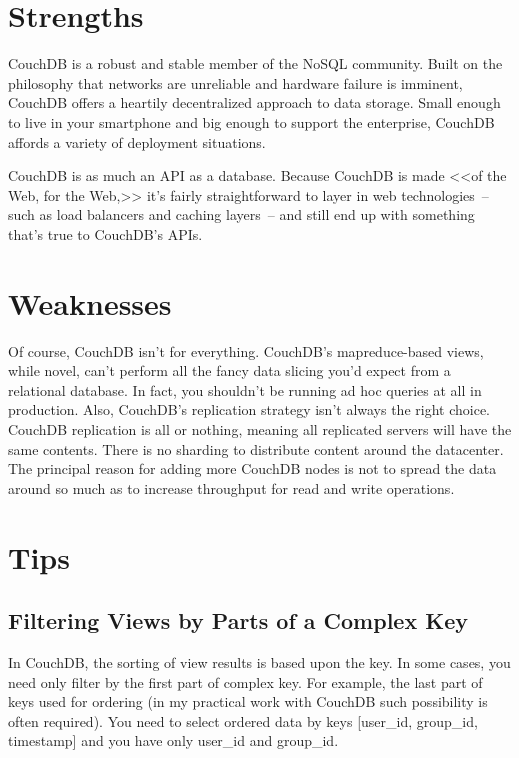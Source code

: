 \section{Strengths}

CouchDB is a robust and stable member of the NoSQL community. Built on the philosophy that networks are unreliable and hardware failure is imminent, CouchDB offers a heartily decentralized approach to data storage. Small enough to live in your smartphone and big enough to support the enterprise, CouchDB affords a variety of deployment situations.

CouchDB is as much an API as a database. Because CouchDB is made <<of the Web, for the Web,>> it’s fairly straightforward to layer in web technologies~-- such as load balancers and caching layers~-- and still end up with something that's true to CouchDB's APIs.\cite{seven_databases}

\section{Weaknesses}

Of course, CouchDB isn't for everything. CouchDB's mapreduce-based views, while novel, can't perform all the fancy data slicing you'd expect from a relational database. In fact, you shouldn't be running ad hoc queries at all in production. Also, CouchDB's replication strategy isn't always the right choice. CouchDB replication is all or nothing, meaning all replicated servers will have the same contents. There is no sharding to distribute content around the datacenter. The principal reason for adding more CouchDB nodes is not to spread the data around so much as to increase throughput for read and write operations.\cite{seven_databases}

\section{Tips}

\subsection{Filtering Views by Parts of a Complex Key}

In CouchDB, the sorting of view results is based upon the key. In some cases, you need only filter by the first part of complex key. For example, the last part of keys used for ordering (in my practical work with CouchDB such possibility is often required). You need to select ordered data by keys [user\_id, group\_id, timestamp] and you have only user\_id and group\_id.

